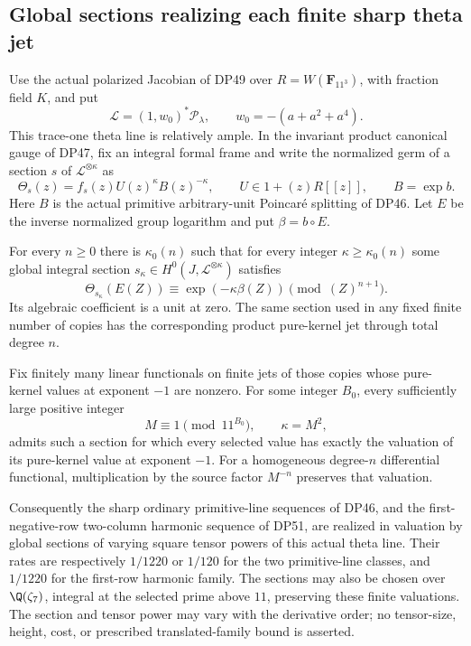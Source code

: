 \subsection{Global sections realizing each finite sharp theta jet}

\begin{theorem}\label{DP54}
Use the actual polarized Jacobian of DP49 over
$R=W(\mathbf F_{11^3})$, with fraction field $K$, and put
\[
 \mathcal L=(1,w_0)^*\mathcal P_\lambda,
 \qquad w_0=-(a+a^2+a^4).
\]
This trace-one theta line is relatively ample.
In the invariant product canonical gauge of DP47, fix an integral formal frame and write the normalized germ of a section $s$ of $\mathcal L^{\otimes\kappa}$ as
\[
 \Theta_s(z)=f_s(z)U(z)^\kappa B(z)^{-\kappa},
 \qquad U\in1+(z)R[[z]],\qquad B=\exp b.
\]
Here $B$ is the actual primitive arbitrary-unit Poincar\'e splitting of DP46.
Let $E$ be the inverse normalized group logarithm and put $\beta=b\circ E$.

For every $n\ge0$ there is $\kappa_0(n)$ such that for every integer
$\kappa\ge\kappa_0(n)$ some global integral section
$s_\kappa\in H^0(J,\mathcal L^{\otimes\kappa})$ satisfies
\begin{equation}\label{eq:globalfinitejet}
 \Theta_{s_\kappa}(E(Z))
 \equiv\exp(-\kappa\beta(Z))\pmod{(Z)^{n+1}}.
\end{equation}
Its algebraic coefficient is a unit at zero. The same section used in any fixed finite number of copies has the corresponding product pure-kernel jet through total degree $n$.

Fix finitely many linear functionals on finite jets of those copies whose pure-kernel values at exponent $-1$ are nonzero. For some integer $B_0$, every sufficiently large positive integer
\[
 M\equiv1\pmod{11^{B_0}},\qquad \kappa=M^2,
\]
admits such a section for which every selected value has exactly the valuation of its pure-kernel value at exponent $-1$.
For a homogeneous degree-$n$ differential functional, multiplication by the source factor $M^{-n}$ preserves that valuation.

Consequently the sharp ordinary primitive-line sequences of DP46, and the first-negative-row two-column harmonic sequence of DP51, are realized in valuation by global sections of varying square tensor powers of this actual theta line. Their rates are respectively $1/1220$ or $1/120$ for the two primitive-line classes, and $1/1220$ for the first-row harmonic family.
The sections may also be chosen over $\Q(\zeta_7)$, integral at the selected prime above $11$, preserving these finite valuations.
The section and tensor power may vary with the derivative order; no tensor-size, height, cost, or prescribed translated-family bound is asserted.
\end{theorem}

